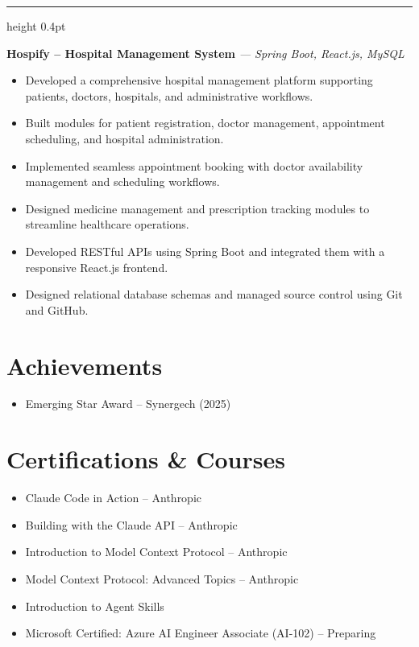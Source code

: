 \documentclass[a4paper,10pt]{article}
\newcommand{\projectdivider}{\vspace{4pt}\textcolor{dividercolor}{\hrule height 0.4pt}\vspace{4pt}}
\newcommand{\projecttitle}[2]{\noindent\textbf{#1} \textit{#2}\par\vspace{1pt}}
\begin{document}
\projectdivider

\projecttitle{Hospify -- Hospital Management System}{--- Spring Boot, React.js, MySQL}
\begin{itemize}
\item Developed a comprehensive hospital management platform supporting patients, doctors, hospitals, and administrative workflows.
\item Built modules for patient registration, doctor management, appointment scheduling, and hospital administration.
\item Implemented seamless appointment booking with doctor availability management and scheduling workflows.
\item Designed medicine management and prescription tracking modules to streamline healthcare operations.
\item Developed RESTful APIs using Spring Boot and integrated them with a responsive React.js frontend.
\item Designed relational database schemas and managed source control using Git and GitHub.
\end{itemize}

\section*{Achievements}
\begin{itemize}
\item Emerging Star Award -- Synergech (2025)
\end{itemize}

\section*{Certifications \& Courses}
\begin{itemize}
\item Claude Code in Action -- Anthropic
\item Building with the Claude API -- Anthropic
\item Introduction to Model Context Protocol -- Anthropic
\item Model Context Protocol: Advanced Topics -- Anthropic
\item Introduction to Agent Skills
\item Microsoft Certified: Azure AI Engineer Associate (AI-102) -- Preparing
\end{itemize}
\end{document}

